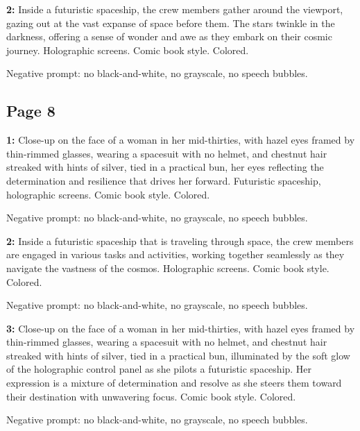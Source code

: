 \begin{iquote}
    \textbf{2:} Inside a futuristic spaceship, the crew members gather around the viewport, gazing out at the vast expanse of space before them. The stars twinkle in the darkness, offering a sense of wonder and awe as they embark on their cosmic journey. Holographic screens. Comic book style. Colored.

    \noindent Negative prompt: no black-and-white, no grayscale, no speech bubbles.
\end{iquote}


\subsection*{Page 8}
\begin{iquote}
    \textbf{1:} Close-up on the face of a woman in her mid-thirties, with hazel eyes framed by thin-rimmed glasses, wearing a spacesuit with no helmet, and chestnut hair streaked with hints of silver, tied in a practical bun, her eyes reflecting the determination and resilience that drives her forward. Futuristic spaceship, holographic screens. Comic book style. Colored.

    \noindent Negative prompt: no black-and-white, no grayscale, no speech bubbles.
\end{iquote}

\begin{iquote}
    \textbf{2:} Inside a futuristic spaceship that is traveling through space, the crew members are engaged in various tasks and activities, working together seamlessly as they navigate the vastness of the cosmos. Holographic screens. Comic book style. Colored.

    \noindent Negative prompt: no black-and-white, no grayscale, no speech bubbles.
\end{iquote}

\begin{iquote}
    \textbf{3:} Close-up on the face of a woman in her mid-thirties, with hazel eyes framed by thin-rimmed glasses, wearing a spacesuit with no helmet, and chestnut hair streaked with hints of silver, tied in a practical bun, illuminated by the soft glow of the holographic control panel as she pilots a futuristic spaceship. Her expression is a mixture of determination and resolve as she steers them toward their destination with unwavering focus. Comic book style. Colored.

    \noindent Negative prompt: no black-and-white, no grayscale, no speech bubbles.
\end{iquote}


